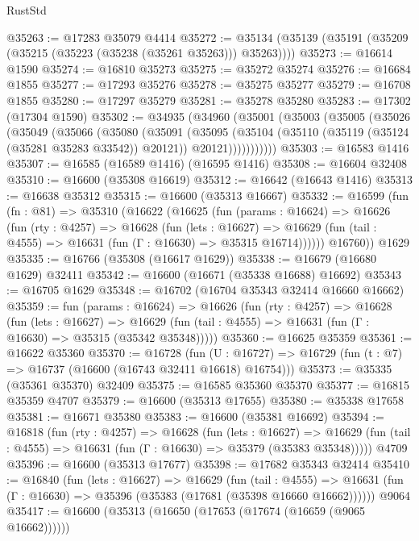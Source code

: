 \begin{lexlean}{RustStd}
\begin{coremodule}
{\begin{coremodule}
{{{{{{{{{{{{{{{{{{{{{{{{{{{{{{{{{{{{{{{{{{{{{{{{{{{{{{{@35263 := @17283 @35079 @4414
@35272 := @35134 (@35139 (@35191 (@35209 (@35215 (@35223 (@35238 (@35261 @35263))) @35263))))
@35273 := @16614 @1590
@35274 := @16810 @35273
@35275 := @35272 @35274
@35276 := @16684 @1855
@35277 := @17293 @35276
@35278 := @35275 @35277
@35279 := @16708 @1855
@35280 := @17297 @35279
@35281 := @35278 @35280
@35283 := @17302 (@17304 @1590)
@35302 := @34935
    (@34960
      (@35001
        (@35003
          (@35005
            (@35026
              (@35049
                (@35066
                  (@35080
                    (@35091
                      (@35095
                        (@35104
                          (@35110 (@35119 (@35124 (@35281 @35283 @33542)) @20121))
                          @20121)))))))))))
@35303 := @16583 @1416
@35307 := @16585 (@16589 @1416) (@16595 @1416)
@35308 := @16604 @32408
@35310 := @16600 (@35308 @16619)
@35312 := @16642 (@16643 @1416)
@35313 := @16638 @35312
@35315 := @16600 (@35313 @16667)
@35332 := @16599
    (fun (fn : @81) =>
    @35310
      (@16622
        (@16625
          (fun (params : @16624) =>
          @16626
            (fun (rty : @4257) =>
            @16628
              (fun (lets : @16627) =>
              @16629 (fun (tail : @4555) => @16631 (fun (Γ : @16630) => @35315 @16714))))))
        @16760))
    @1629
@35335 := @16766 (@35308 (@16617 @1629))
@35338 := @16679 (@16680 @1629) @32411
@35342 := @16600 (@16671 (@35338 @16688) @16692)
@35343 := @16705 @1629
@35348 := @16702 (@16704 @35343 @32414 @16660 @16662)
@35359 := fun (params : @16624) =>
  @16626
    (fun (rty : @4257) =>
    @16628
      (fun (lets : @16627) =>
      @16629 (fun (tail : @4555) => @16631 (fun (Γ : @16630) => @35315 (@35342 @35348)))))
@35360 := @16625 @35359
@35361 := @16622 @35360
@35370 := @16728
    (fun (U : @16727) => @16729 (fun (t : @7) => @16737 (@16600 (@16743 @32411 @16618) @16754)))
@35373 := @35335 (@35361 @35370) @32409
@35375 := @16585 @35360 @35370
@35377 := @16815 @35359 @4707
@35379 := @16600 (@35313 @17655)
@35380 := @35338 @17658
@35381 := @16671 @35380
@35383 := @16600 (@35381 @16692)
@35394 := @16818
    (fun (rty : @4257) =>
    @16628
      (fun (lets : @16627) =>
      @16629 (fun (tail : @4555) => @16631 (fun (Γ : @16630) => @35379 (@35383 @35348)))))
    @4709
@35396 := @16600 (@35313 @17677)
@35398 := @17682 @35343 @32414
@35410 := @16840
    (fun (lets : @16627) =>
    @16629
      (fun (tail : @4555) =>
      @16631 (fun (Γ : @16630) => @35396 (@35383 (@17681 (@35398 @16660 @16662))))))
    @9064
@35417 := @16600 (@35313 (@16650 (@17653 (@17674 (@16659 (@9065 @16662))))))
}}}}}}}}}}}}}}}}}}}}}}}}}}}}}}}}}}}}}}}}}}}}}}}}}}}}}}}
\end{coremodule}}
\end{coremodule}
\end{lexlean}
